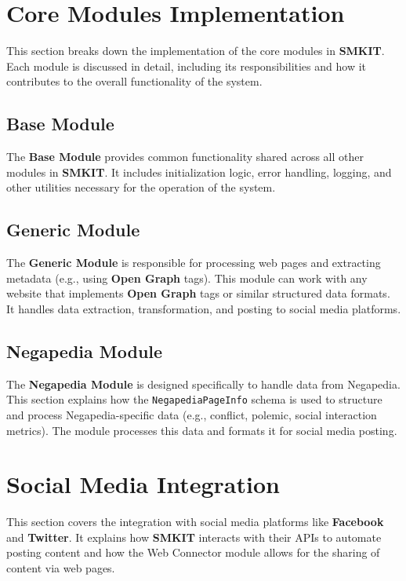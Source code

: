 \section{Core Modules Implementation}
\label{sec:core_modules_implementation}
This section breaks down the implementation of the core modules in \textbf{SMKIT}. Each module is discussed in detail, including its responsibilities and how it contributes to the overall functionality of the system.

\subsection{Base Module}
\label{subsec:base_module}
The \textbf{Base Module} provides common functionality shared across all other modules in \textbf{SMKIT}. It includes initialization logic, error handling, logging, and other utilities necessary for the operation of the system.

\subsection{Generic Module}
\label{subsec:generic_module}
The \textbf{Generic Module} is responsible for processing web pages and extracting metadata (e.g., using \textbf{Open Graph} tags). This module can work with any website that implements \textbf{Open Graph} tags or similar structured data formats. It handles data extraction, transformation, and posting to social media platforms.

\subsection{Negapedia Module}
\label{subsec:negapedia_module}
The \textbf{Negapedia Module} is designed specifically to handle data from Negapedia. This section explains how the \texttt{NegapediaPageInfo} schema is used to structure and process Negapedia-specific data (e.g., conflict, polemic, social interaction metrics). The module processes this data and formats it for social media posting.

\section{Social Media Integration}
\label{sec:social_media_integration}
This section covers the integration with social media platforms like \textbf{Facebook} and \textbf{Twitter}. It explains how \textbf{SMKIT} interacts with their APIs to automate posting content and how the Web Connector module allows for the sharing of content via web pages.

